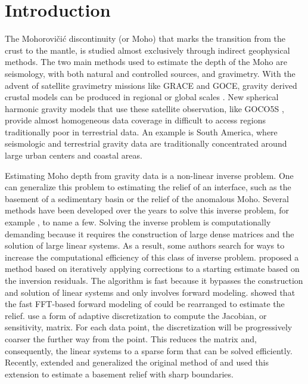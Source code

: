 \section{Introduction}

The Mohorovičić discontinuity (or Moho) that marks the transition from the
crust to the mantle, is studied almost exclusively through indirect geophysical
methods.
The two main methods used to estimate the depth of the Moho are seismology,
with both natural and controlled sources, and gravimetry.
With the advent of satellite gravimetry missions like GRACE and GOCE,
gravity derived crustal models can be produced in regional or global scales
\citep[e.g. ][]{reguzzoni2013,vandermeijde2013,vandermeijde2015}.
New spherical harmonic gravity models that use these satellite observation,
like GOCO5S \citep{mayer-guerr2015}, provide almost homogeneous data coverage
in difficult to access regions traditionally poor in terrestrial data.
An example is South America, where seismologic and terrestrial gravity data
are traditionally concentrated around large urban centers and coastal areas.

Estimating Moho depth from gravity data is a non-linear inverse problem.
One can generalize this problem to estimating the relief of an interface,
such as the basement of a sedimentary basin or the relief of the anomalous
Moho.
Several methods have been developed over the years to solve this inverse
problem, for example
\citet{bott1960, barbosa1999b, barbosa1999a, barnes2012, leao1996, martins2010,
martins2011, oldenburg1974, reguzzoni2013, santos2015, silva2006, silva2014},
to name a few.
Solving the inverse problem is computationally demanding because it requires
the construction of large dense matrices and the solution of large linear
systems.
As a result, some authors search for ways to increase the computational
efficiency of this class of inverse problem.
\citet{bott1960} proposed a method based on iteratively applying corrections to
a starting estimate based on the inversion residuals.
The algorithm is fast because it bypasses the construction and solution of
linear systems and only involves forward modeling.
\citet{oldenburg1974} showed that the fast FFT-based forward modeling of
\citet{parker1973} could be rearranged to estimate the relief.
\citet{barnes2012} use a form of adaptive discretization to compute the
Jacobian, or sensitivity, matrix.
For each data point, the discretization will be progressively coarser
the further way from the point.
This reduces the matrix and, consequently, the linear systems to a sparse form
that can be solved efficiently.
Recently, \citet{silva2014} extended and generalized the original method of
\citet{bott1960} and \citet{santos2015} used this extension to estimate a
basement relief with sharp boundaries.

